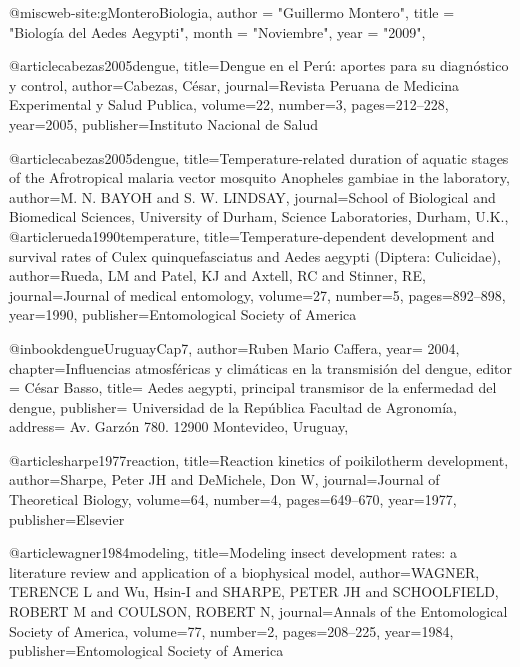 @misc{web-site:gMonteroBiologia,
      author = "Guillermo Montero",
      title = "Biología del Aedes Aegypti",
      month = "Noviembre",
      year = "2009",
}

@article{cabezas2005dengue,
  title={Dengue en el Per{\'u}: aportes para su diagn{\'o}stico y control},
  author={Cabezas, C{\'e}sar},
  journal={Revista Peruana de Medicina Experimental y Salud Publica},
  volume={22},
  number={3},
  pages={212--228},
  year={2005},
  publisher={Instituto Nacional de Salud}
}

@article{cabezas2005dengue,
  title={Temperature-related duration of aquatic stages of the Afrotropical malaria vector mosquito Anopheles gambiae in the laboratory},
  author={M. N. BAYOH and S. W. LINDSAY},
  journal={School of Biological and Biomedical Sciences, University of Durham, Science Laboratories, Durham, U.K.},
}
@article{rueda1990temperature,
  title={Temperature-dependent development and survival rates of Culex quinquefasciatus and Aedes aegypti (Diptera: Culicidae)},
  author={Rueda, LM and Patel, KJ and Axtell, RC and Stinner, RE},
  journal={Journal of medical entomology},
  volume={27},
  number={5},
  pages={892--898},
  year={1990},
  publisher={Entomological Society of America}
}

@inbook{dengueUruguayCap7,
  author={Ruben Mario Caffera},
  year= 2004, 
  chapter={Influencias atmosféricas y climáticas en la transmisión del dengue}, 
  editor = {César Basso}, 
  title= {Aedes aegypti, principal transmisor de la enfermedad del dengue}, 
  publisher= {Universidad de la República Facultad de Agronomía},
  address= {Av. Garzón 780. 12900 Montevideo, Uruguay}, 
}

@article{sharpe1977reaction,
  title={Reaction kinetics of poikilotherm development},
  author={Sharpe, Peter JH and DeMichele, Don W},
  journal={Journal of Theoretical Biology},
  volume={64},
  number={4},
  pages={649--670},
  year={1977},
  publisher={Elsevier}
}

@article{wagner1984modeling,
  title={Modeling insect development rates: a literature review and application of a biophysical model},
  author={WAGNER, TERENCE L and Wu, Hsin-I and SHARPE, PETER JH and SCHOOLFIELD, ROBERT M and COULSON, ROBERT N},
  journal={Annals of the Entomological Society of America},
  volume={77},
  number={2},
  pages={208--225},
  year={1984},
  publisher={Entomological Society of America}
}

